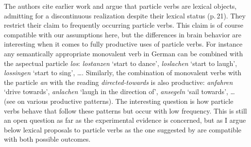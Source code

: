 \begin{exe}
\begin{xlist}[iv.]
\begin{exe}
\begin{xlist}[iv.]
The authors cite earlier work \citep*{CSP2010a} and argue that particle verbs are lexical objects,
admitting for a discontinuous realization despite their lexical status
(p.\,21). They restrict their claim to frequently occurring particle verbs. This claim is of course
compatible with our assumptions here, but the differences in brain behavior are interesting when it
comes to fully productive uses of particle verbs. For instance any semantically appropriate monovalent verb in German can
be combined with the aspectual particle \emph{los}: \emph{lostanzen} `start to dance',
\emph{loslachen} `start to laugh', \emph{lossingen} `start to sing', \ldots. Similarly, the
combination of monovalent verbs with the particle \emph{an} with the reading \emph{directed-towards} is
also productive: \emph{anfahren} `drive towards', \emph{anlachen} `laugh in the direction of',
\emph{ansegeln} `sail towards', \ldots{} (see  on various productive
patterns). 
The interesting question is how particle verbs behave that follow these patterns but occur with low
frequency. This is still an open question as far as the experimental evidence is concerned, but as
I argue below lexical proposals to particle verbs as the one suggested by \citet{Mueller2003a} are
compatible with both possible outcomes.


\end{xlist}
\end{exe}
\end{xlist}
\end{exe}
